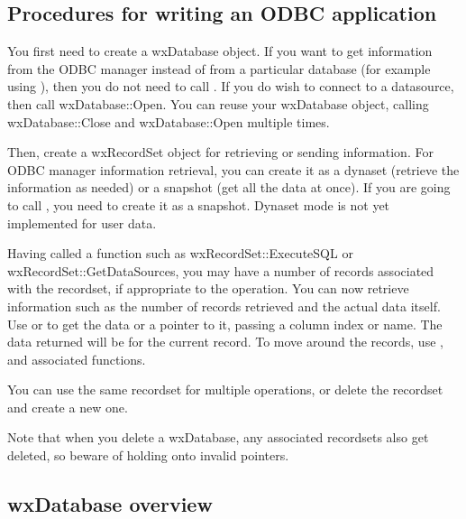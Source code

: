 \subsection{Procedures for writing an ODBC application}

You first need to create a wxDatabase object. If you want to get information
from the ODBC manager instead of from a particular database (for example
using ), then you
do not need to call .
If you do wish to connect to a datasource, then call wxDatabase::Open.
You can reuse your wxDatabase object, calling wxDatabase::Close and wxDatabase::Open
multiple times.

Then, create a wxRecordSet object for retrieving or sending information.
For ODBC manager information retrieval, you can create it as a dynaset (retrieve the
information as needed) or a snapshot (get all the data at once).
If you are going to call , you need to create it as a snapshot.
Dynaset mode is not yet implemented for user data.

Having called a function such as wxRecordSet::ExecuteSQL or
wxRecordSet::GetDataSources, you may have a number of records
associated with the recordset, if appropriate to the operation. You can
now retrieve information such as the number of records retrieved and the
actual data itself. Use  or
 to get the data or a pointer to it, passing
a column index or name. The data returned will be for the current
record. To move around the records, use ,
\rtfsp{} and associated functions.

You can use the same recordset for multiple operations, or delete
the recordset and create a new one.

Note that when you delete a wxDatabase, any associated recordsets
also get deleted, so beware of holding onto invalid pointers.

\subsection{wxDatabase overview}\label{wxdatabaseoverview}


